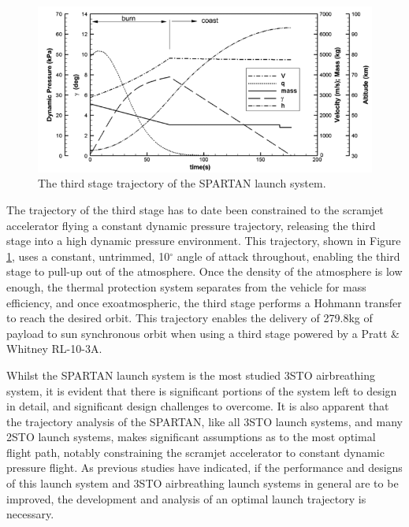  
 \begin{figure}[ht]
 	\centering
 	\includegraphics[width=0.9\linewidth]{figures/2_literature-review/SPARTAN_trajthirdstage}
 	\caption{The third stage trajectory of the SPARTAN launch system\cite{Preller2018a}.}
 	\label{fig:SPARTAN_trajthirdstage}
 \end{figure}

The trajectory of the third stage has to date been constrained to the scramjet accelerator flying a constant dynamic pressure trajectory, releasing the third stage into a high dynamic pressure environment. This trajectory, shown in Figure \ref{fig:SPARTAN_trajthirdstage}, uses a constant, untrimmed, 10$^\circ$ angle of attack throughout, enabling the third stage to pull-up out of the atmosphere.  
 Once the density of the atmosphere is low enough, the thermal protection system separates from the vehicle for mass efficiency, and once exoatmospheric, the third stage performs a Hohmann transfer to reach the desired orbit. 
This trajectory enables the delivery of 279.8kg\cite{Preller2018a} of payload to sun synchronous orbit when using a third stage powered by a Pratt \& Whitney RL-10-3A\cite{Preller2018a}. 

Whilst the SPARTAN launch system is the most studied 3STO airbreathing system, it is evident that there is significant portions of the system left to design in detail, and significant design challenges to overcome. It is also apparent that the trajectory analysis of the SPARTAN, like all 3STO launch systems, and many 2STO launch systems, makes significant assumptions as to the most optimal flight path, notably constraining the scramjet accelerator to constant dynamic pressure flight. 
As previous studies have indicated\cite{Preller2017b}, if the performance and designs of this launch system and 3STO airbreathing launch systems in general are to be improved, the development and analysis of an optimal launch trajectory is necessary.



